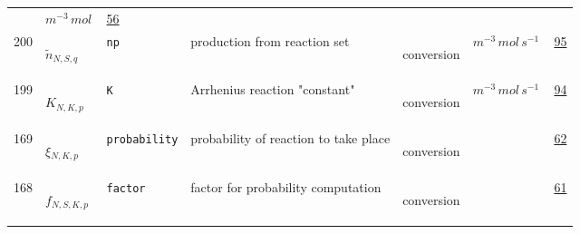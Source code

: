 \begin{longtable}{|p{1cm}|p{2.5cm}|p{4.5cm}|p{8cm}|p{3.0cm}|p{3cm}|p{1cm}|}
             & $ m^{-3} \,mol \, $
             &                 \hyperlink{"e:56"}{ 56 }
                 \\
            200
             & \hypertarget{"v:200"}{ $ {{\tilde{n}}}{_{N, S, q}} $}
             & \verb|np|
             & production from reaction set
             & \begin{lay}conversion \end{lay}
             & $ m^{-3} \,mol \,s^{-1} \, $
             &                 \hyperlink{"e:95"}{ 95 }
                 \\
            199
             & \hypertarget{"v:199"}{ $ {K}{_{N, K, p}} $}
             & \verb|K|
             & Arrhenius reaction "constant"
             & \begin{lay}conversion \end{lay}
             & $ m^{-3} \,mol \,s^{-1} \, $
             &                 \hyperlink{"e:94"}{ 94 }
                 \\
            169
             & \hypertarget{"v:169"}{ $ {\xi}{_{N, K, p}} $}
             & \verb|probability|
             & probability of reaction to take place
             & \begin{lay}conversion \end{lay}
             & $  $
             &                 \hyperlink{"e:62"}{ 62 }
                 \\
            168
             & \hypertarget{"v:168"}{ $ {f}{_{N, S, K, p}} $}
             & \verb|factor|
             & factor for probability computation
             & \begin{lay}conversion \end{lay}
             & $  $
             &                 \hyperlink{"e:61"}{ 61 }
                 \\
    \end{longtable}